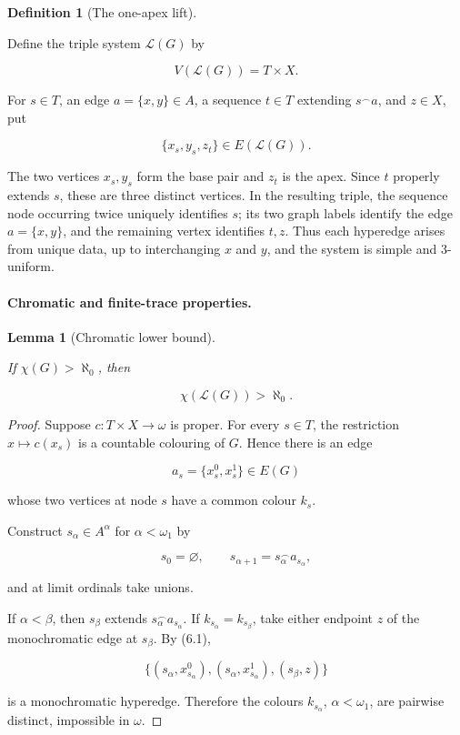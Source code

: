 \documentclass[a4paper,11pt,reqno]{amsart}
\theoremstyle{plain}
\newtheorem{lemma}[theorem]{Lemma}
\theoremstyle{definition}
\newtheorem{definition}[theorem]{Definition}
\theoremstyle{remark}
\begin{document}
\begin{definition}[The one-apex lift]\label{definition-6.1-the-one-apex-lift}

Define the triple system \(\mathcal L(G)\) by

\[
V(\mathcal L(G))=T\times X.
\]

For \(s\in T\), an edge \(a=\{x,y\}\in A\), a sequence \(t\in T\) extending \(s^\frown a\), and \(z\in X\), put

\[
\{x_s,y_s,z_t\}\in E(\mathcal L(G)). \tag{6.1}
\]

The two vertices \(x_s,y_s\) form the base pair and \(z_t\) is the apex. Since \(t\) properly extends \(s\), these are three distinct vertices. In the resulting triple, the sequence node occurring twice uniquely identifies \(s\); its two graph labels identify the edge \(a=\{x,y\}\), and the remaining vertex identifies \(t,z\). Thus each hyperedge arises from unique data, up to interchanging \(x\) and \(y\), and the system is simple and \(3\)-uniform.

\end{definition}

\paragraph{Chromatic and finite-trace properties.}\label{chromatic-and-finite-trace-properties}

\begin{lemma}[Chromatic lower bound]\label{lemma-6.2-chromatic-lower-bound}

If \(\chi(G)>\aleph_0\), then

\[
\chi(\mathcal L(G))>\aleph_0.
\]

\end{lemma}
\begin{proof}
Suppose \(c:T\times X\to\omega\) is proper. For every \(s\in T\), the restriction \(x\mapsto c(x_s)\) is a countable colouring of \(G\). Hence there is an edge

\[
a_s=\{x_s^0,x_s^1\}\in E(G)
\]

whose two vertices at node \(s\) have a common colour \(k_s\).

Construct \(s_\alpha\in A^\alpha\) for \(\alpha<\omega_1\) by

\[
s_0=\varnothing,
\qquad s_{\alpha+1}=s_\alpha^\frown a_{s_\alpha},
\]

and at limit ordinals take unions.

If \(\alpha<\beta\), then \(s_\beta\) extends \(s_\alpha^\frown a_{s_\alpha}\). If \(k_{s_\alpha}=k_{s_\beta}\), take either endpoint \(z\) of the monochromatic edge at \(s_\beta\). By (6.1),

\[
\{(s_\alpha,x_{s_\alpha}^0),
  (s_\alpha,x_{s_\alpha}^1),
  (s_\beta,z)\}
\]

is a monochromatic hyperedge. Therefore the colours \(k_{s_\alpha}\), \(\alpha<\omega_1\), are pairwise distinct, impossible in \(\omega\).
\end{proof}
\end{document}
